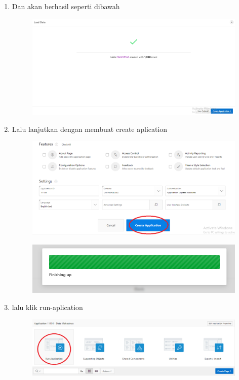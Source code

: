 \begin{enumerate}
	
	\item Dan akan berhasil seperti dibawah 
	\begin{figure} [!htbp]
	\includegraphics[scale=0.2]{Apex/192.png}
	\centering
	\end{figure}
	
	\item Lalu lanjutkan dengan membuat create aplication
	\begin{figure} [!htbp]
	\includegraphics[scale=0.2]{Apex/23.png}
	\centering
	\end{figure}
	\begin{figure} [!htbp]
	\includegraphics[scale=0.2]{Apex/25.png}
	\centering
	\end{figure}
	
	\item lalu klik run-aplication
	\begin{figure} [!htbp]
	\includegraphics[scale=0.2]{Apex/26.png}
	\centering
	\end{figure}
	

\end{enumerate}

